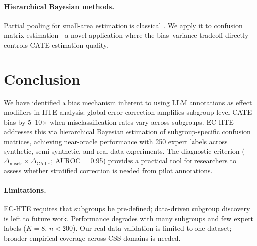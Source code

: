 \documentclass[11pt,a4paper]{article}
\begin{document}
\paragraph{Hierarchical Bayesian methods.}
Partial pooling for small-area estimation is classical \citep{gelman2006data}.
We apply it to confusion matrix estimation---a novel application where the bias--variance tradeoff directly controls CATE estimation quality.

\section{Conclusion}
\label{sec:conclusion}

We have identified a bias mechanism inherent to using LLM annotations as effect modifiers in HTE analysis: global error correction amplifies subgroup-level CATE bias by 5--10$\times$ when misclassification rates vary across subgroups.
EC-HTE addresses this via hierarchical Bayesian estimation of subgroup-specific confusion matrices, achieving near-oracle performance with 250 expert labels across synthetic, semi-synthetic, and real-data experiments.
The diagnostic criterion ($\Delta_{\text{miscls}} \times \Delta_{\text{CATE}}$; AUROC = 0.95) provides a practical tool for researchers to assess whether stratified correction is needed from pilot annotations.

\paragraph{Limitations.}
EC-HTE requires that subgroups be pre-defined; data-driven subgroup discovery is left to future work.
Performance degrades with many subgroups and few expert labels ($K = 8$, $n < 200$).
Our real-data validation is limited to one dataset; broader empirical coverage across CSS domains is needed.


\end{document}
